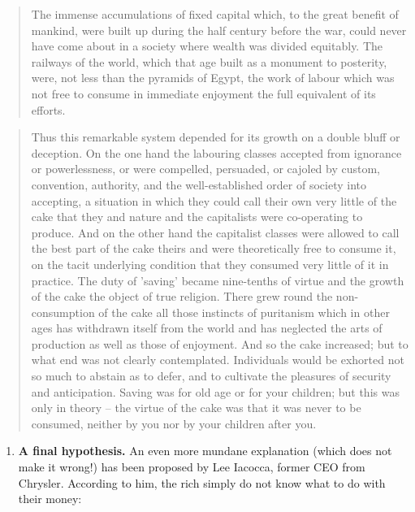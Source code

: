 \documentclass[]{book}
\providecommand{\tightlist}{%
  \setlength{\itemsep}{0pt}\setlength{\parskip}{0pt}}
\begin{document}
\begin{quote}
The immense accumulations of fixed capital which, to the great benefit
of mankind, were built up during the half century before the war, could
never have come about in a society where wealth was divided equitably.
The railways of the world, which that age built as a monument to
posterity, were, not less than the pyramids of Egypt, the work of labour
which was not free to consume in immediate enjoyment the full equivalent
of its efforts.
\end{quote}

\begin{quote}
Thus this remarkable system depended for its growth on a double bluff or
deception. On the one hand the labouring classes accepted from ignorance
or powerlessness, or were compelled, persuaded, or cajoled by custom,
convention, authority, and the well-established order of society into
accepting, a situation in which they could call their own very little of
the cake that they and nature and the capitalists were co-operating to
produce. And on the other hand the capitalist classes were allowed to
call the best part of the cake theirs and were theoretically free to
consume it, on the tacit underlying condition that they consumed very
little of it in practice. The duty of 'saving' became nine-tenths of
virtue and the growth of the cake the object of true religion. There
grew round the non-consumption of the cake all those instincts of
puritanism which in other ages has withdrawn itself from the world and
has neglected the arts of production as well as those of enjoyment. And
so the cake increased; but to what end was not clearly contemplated.
Individuals would be exhorted not so much to abstain as to defer, and to
cultivate the pleasures of security and anticipation. Saving was for old
age or for your children; but this was only in theory -- the virtue of
the cake was that it was never to be consumed, neither by you nor by
your children after you.
\end{quote}

\begin{enumerate}
\def\labelenumi{\arabic{enumi}.}
\setcounter{enumi}{4}
\tightlist
\item
  \textbf{A final hypothesis.} An even more mundane explanation (which
  does not make it wrong!) has been proposed by Lee Iacocca, former CEO
  from Chrysler. According to him, the rich simply do not know what to
  do with their money:
\end{enumerate}
\end{document}
